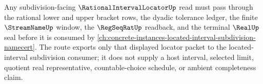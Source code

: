 Any subdivision-facing $\RationalIntervalLocatorUp$ read must pass through the rational lower and upper bracket rows, the dyadic tolerance ledger, the finite $\StreamNameUp$ window, the $\RegSeqRatUp$ readback, and the terminal $\RealUp$ seal before it is consumed by \autoref{ch:concrete-instances-located-interval-subdivision-namecert}. The route exports only that displayed locator packet to the located-interval subdivision consumer; it does not supply a host interval, selected limit, quotient real representative, countable-choice schedule, or ambient completeness claim.
